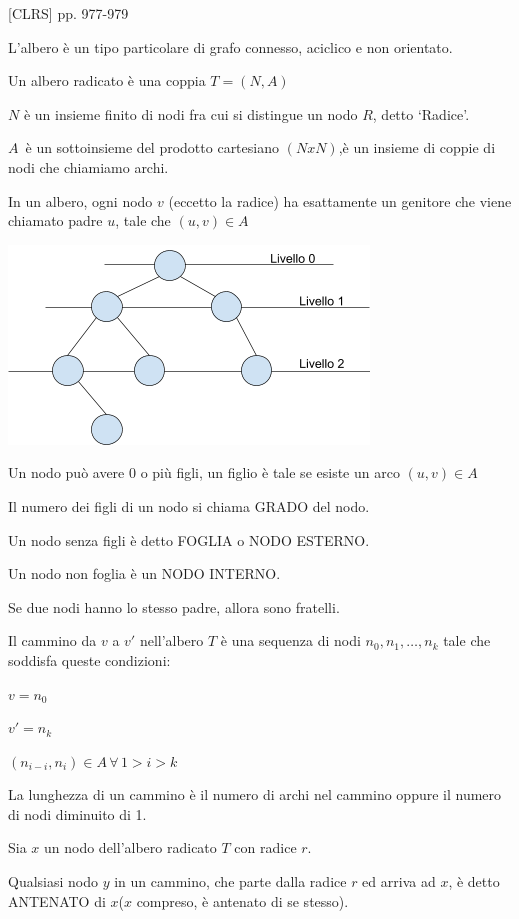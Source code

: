 \documentclass{article}
\begin{document}
{{{{{[}CLRS{]} pp. 977-979}

{L'albero è un tipo particolare di grafo connesso, aciclico e non orientato.}

{Un albero radicato è una coppia $T=(N,A)$}

{$N$ è un insieme finito di nodi fra cui si distingue un nodo $R$, detto `Radice'.}

$A${~è un sottoinsieme del prodotto cartesiano $(NxN)$,è un insieme di coppie di nodi che chiamiamo archi.}

{In un albero, ogni nodo $v$ (eccetto la radice) ha esattamente un genitore che viene chiamato padre $u$, tale che $(u,v) \in A$}

{\includegraphics{images/image539.png}}

{Un nodo può avere $0$ o più figli, un figlio è tale se esiste un arco $(u,v) \in A$}

{Il numero dei figli di un nodo si chiama GRADO del nodo.}

{Un nodo senza figli è detto FOGLIA o NODO ESTERNO.}

{Un nodo non foglia è un NODO INTERNO.}

{Se due nodi hanno lo stesso padre, allora sono fratelli.}

{Il cammino da $v$ a $v'$ nell'albero $T$ è una sequenza di nodi $n_0,n_1,\ldots,n_k$ tale che soddisfa queste condizioni:}

$v=n_0$

$v'=n_k$

$(n_{i-i},n_i) \in A\,\forall\,1>i>k$

{La lunghezza di un cammino è il numero di archi nel cammino oppure il numero di nodi diminuito di 1.}

{Sia $x$ un nodo dell'albero radicato $T$ con radice $r$.}

{Qualsiasi nodo $y$ in un cammino, che parte dalla radice $r$ ed arriva ad $x$, è detto ANTENATO di $x$($x$ compreso, è antenato di se stesso).}

}}}
\end{document}
